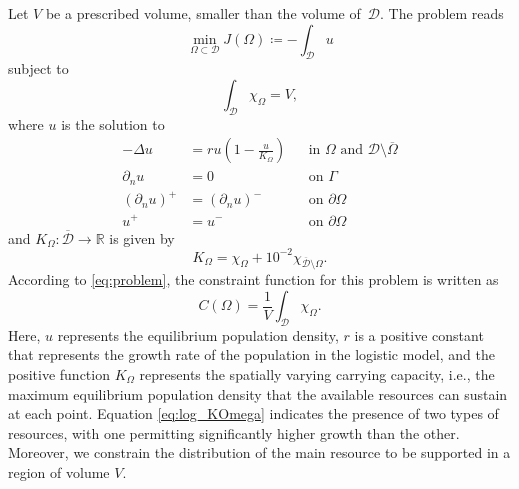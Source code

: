 \documentclass[iicol,pdflatex,sn-mathphys-ay]{sn-jnl}%
\theoremstyle{thmstyleone}%
\theoremstyle{thmstyletwo}%
\theoremstyle{thmstylethree}%
\begin{document}
Let $V$ be a prescribed volume, smaller than the volume of~$\mathcal{D}$.
The problem reads
\begin{equation}\label{eq:log_cost}
	\min_{\Omega \subset \mathcal{D}}
	J(\Omega) \coloneqq -\int_{\mathcal{D}} u
\end{equation}
subject to
\begin{equation}
	\int_{\mathcal{D}} \chi_{\Omega} = V,
\end{equation}
where $u$ is the solution to
\begin{equation}\label{eq:log_prob}
\begin{aligned}
	-\Delta u &= r u \left(1-\frac{u}{K_\Omega}\right)
	&& \text{in } \Omega \text{ and } \mathcal{D}\setminus\overline{\Omega}\\
	\partial_{n} u &= 0 && \text{on } \Gamma\\
	(\partial_n u)^+ &= (\partial_n u)^- && \text{on } \partial\Omega \\ 
				u^+ &= u^- && \text{on } \partial\Omega
\end{aligned}
\end{equation}
and $K_{\Omega}\colon\overline{\mathcal{D}}\to\mathds{R}$ is given by
\begin{equation}\label{eq:log_KOmega}
	K_\Omega=\chi_\Omega+{10}^{-2}\chi_{\overline{\mathcal{D}}\setminus\Omega}.
\end{equation}
According to \eqref{eq:problem},
the constraint function for this problem is written as
\begin{equation}\label{eq:log_const}
	C(\Omega) = \frac{1}{V} \int_{\mathcal{D}} \chi_{\Omega}.
\end{equation}
Here, $u$ represents the equilibrium population density,
$r$ is a positive constant that represents the growth rate
of the population in the logistic model,
and the positive function $K_\Omega$ represents
the spatially varying carrying capacity, i.e.,
the maximum equilibrium population density that the available
resources can sustain at each point. Equation \eqref{eq:log_KOmega}
indicates the presence of two types of resources,
with one permitting significantly higher growth than the other.
Moreover, we constrain the distribution of the main resource
to be supported in a region of volume $V$.
\end{document}

